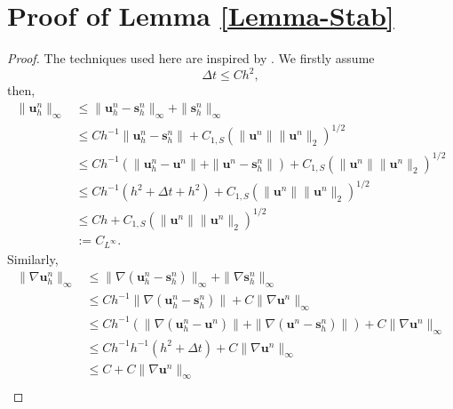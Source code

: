\documentclass[10pt,twoside,openany,UTF8,CJK]{article}
\begin{document}
	\section{Proof of Lemma \ref{Lemma-Stab}} \label{Proof-Stab}	
	\begin{proof}
		The techniques used here are inspired by \cite{POD-LPS-SINUM-2021}. We firstly assume
		\begin{equation}\label{dt-h2}
			\Delta t \leq Ch^2,
		\end{equation}
		then, 
		\begin{equation}\label{Cons-unh-Linfty}
		\begin{aligned}		
			\|\boldsymbol{u}^n_h\|_{\infty} &\leq \|\boldsymbol{u}^n_h - \boldsymbol{s}^n_h\|_{\infty} + \|\boldsymbol{s}^n_h\|_{\infty} \\
			&\leq Ch^{-1}\|\boldsymbol{u}^n_h - \boldsymbol{s}^n_h\| + C_{1,S}\left(\|\boldsymbol{u}^n\|\|\boldsymbol{u}^n\|_{2}\right)^{1/2} \\
			&\leq Ch^{-1}\left(\|\boldsymbol{u}^n_h - \boldsymbol{u}^n\| + \|\boldsymbol{u}^n - \boldsymbol{s}^n_h\|\right) + C_{1,S}\left(\|\boldsymbol{u}^n\|\|\boldsymbol{u}^n\|_{2}\right)^{1/2}	\\
			&\leq Ch^{-1}\left(h^2 + \Delta t + h^2\right) + C_{1,S}\left(\|\boldsymbol{u}^n\|\|\boldsymbol{u}^n\|_{2}\right)^{1/2} \\
			&\leq Ch + C_{1,S}\left(\|\boldsymbol{u}^n\|\|\boldsymbol{u}^n\|_{2}\right)^{1/2} \\
			&:= C_{L^{\infty}}.
		\end{aligned}
	    \end{equation}		
		Similarly, 
		\begin{equation}\label{Cons-unh-W1infty}
		\begin{aligned}		
			\|\nabla \boldsymbol{u}^n_h\|_{\infty} &\leq \|\nabla (\boldsymbol{u}^n_h - \boldsymbol{s}^n_h)\|_{\infty} + \|\nabla \boldsymbol{s}^n_h\|_{\infty} \\
			&\leq Ch^{-1}\|\nabla (\boldsymbol{u}^n_h - \boldsymbol{s}^n_h)\| + C\|\nabla \boldsymbol{u}^n\|_{\infty} \\
			&\leq Ch^{-1}\left(\|\nabla (\boldsymbol{u}^n_h - \boldsymbol{u}^n)\| + \|\nabla (\boldsymbol{u}^n - \boldsymbol{s}^n_h)\|\right) + C\|\nabla \boldsymbol{u}^n\|_{\infty}	\\
			&\leq Ch^{-1}h^{-1}\left(h^2 + \Delta t\right) + C\|\nabla \boldsymbol{u}^n\|_{\infty} \\
			&\leq C + C\|\nabla \boldsymbol{u}^n\|_{\infty} \\

\end{aligned}
\end{equation}
\end{proof}
\end{document}
